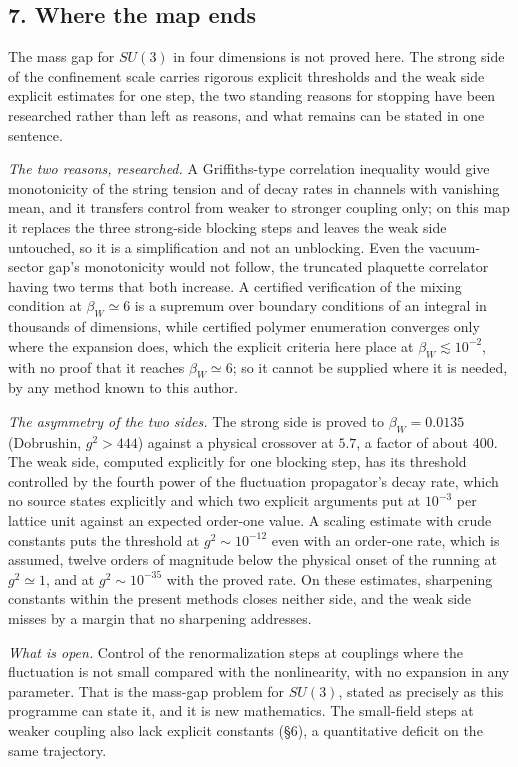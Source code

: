 \documentclass[11pt,a4paper]{article}
\begin{document}
\hypertarget{where-the-map-ends}{%
\subsection{7. Where the map ends}\label{where-the-map-ends}}

The mass gap for \(SU(3)\) in four dimensions is not proved here. The
strong side of the confinement scale carries rigorous explicit
thresholds and the weak side explicit estimates for one step, the two
standing reasons for stopping have been researched rather than left as
reasons, and what remains can be stated in one sentence.

\emph{The two reasons, researched.} A Griffiths-type correlation
inequality would give monotonicity of the string tension and of decay
rates in channels with vanishing mean, and it transfers control from
weaker to stronger coupling only; on this map it replaces the three
strong-side blocking steps and leaves the weak side untouched, so it is
a simplification and not an unblocking. Even the vacuum-sector gap's
monotonicity would not follow, the truncated plaquette correlator having
two terms that both increase. A certified verification of the mixing
condition at \(\beta_W\simeq6\) is a supremum over boundary conditions
of an integral in thousands of dimensions, while certified polymer
enumeration converges only where the expansion does, which the explicit
criteria here place at \(\beta_W\lesssim10^{-2}\), with no proof that it
reaches \(\beta_W\simeq6\); so it cannot be supplied where it is needed,
by any method known to this author.

\emph{The asymmetry of the two sides.} The strong side is proved to
\(\beta_W=0.0135\) (Dobrushin, \(g^2>444\)) against a physical crossover
at \(5.7\), a factor of about \(400\). The weak side, computed
explicitly for one blocking step, has its threshold controlled by the
fourth power of the fluctuation propagator's decay rate, which no source
states explicitly and which two explicit arguments put at \(10^{-3}\)
per lattice unit against an expected order-one value. A scaling estimate
with crude constants puts the threshold at \(g^2\sim10^{-12}\) even with
an order-one rate, which is assumed, twelve orders of magnitude below
the physical onset of the running at \(g^2\simeq1\), and at
\(g^2\sim10^{-35}\) with the proved rate. On these estimates, sharpening
constants within the present methods closes neither side, and the weak
side misses by a margin that no sharpening addresses.

\emph{What is open.} Control of the renormalization steps at couplings
where the fluctuation is not small compared with the nonlinearity, with
no expansion in any parameter. That is the mass-gap problem for
\(SU(3)\), stated as precisely as this programme can state it, and it is
new mathematics. The small-field steps at weaker coupling also lack
explicit constants (§6), a quantitative deficit on the same trajectory.
\end{document}
